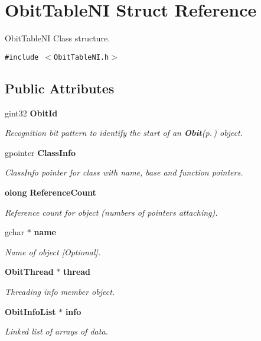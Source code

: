 \section{Obit\-Table\-NI Struct Reference}
\label{structObitTableNI}
Obit\-Table\-NI Class structure.  


{\tt \#include $<$Obit\-Table\-NI.h$>$}

\subsection*{Public Attributes}
\begin{CompactItemize}
\item 
gint32 {\bf Obit\-Id}
\begin{CompactList}\small\item\em Recognition bit pattern to identify the start of an {\bf Obit}{\rm (p.\,\pageref{structObit})} object. \item\end{CompactList}\item 
gpointer {\bf Class\-Info}
\begin{CompactList}\small\item\em Class\-Info pointer for class with name, base and function pointers. \item\end{CompactList}\item 
{\bf olong} {\bf Reference\-Count}
\begin{CompactList}\small\item\em Reference count for object (numbers of pointers attaching). \item\end{CompactList}\item 
gchar $\ast$ {\bf name}
\begin{CompactList}\small\item\em Name of object [Optional]. \item\end{CompactList}\item 
{\bf Obit\-Thread} $\ast$ {\bf thread}
\begin{CompactList}\small\item\em Threading info member object. \item\end{CompactList}\item 
{\bf Obit\-Info\-List} $\ast$ {\bf info}
\begin{CompactList}\small\item\em Linked list of arrays of data. \item\end{CompactList}\item 

\end{CompactItemize}
